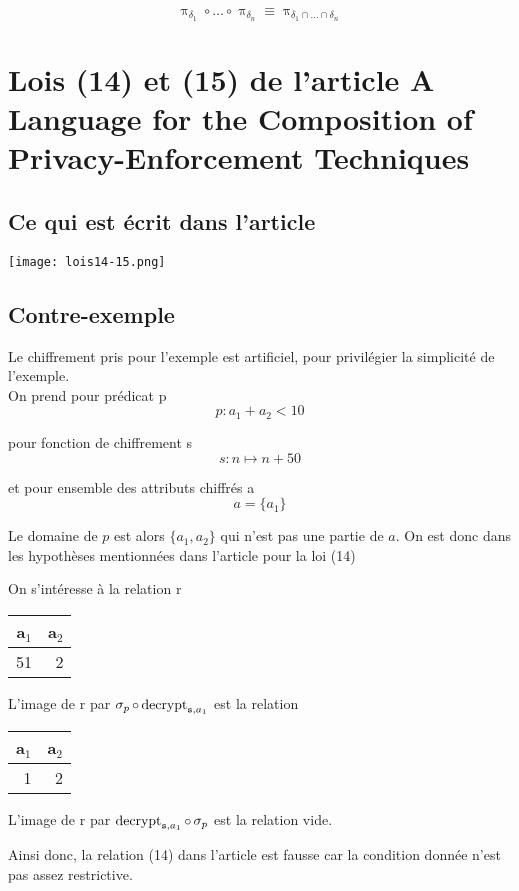 \documentclass[french]{article}
\DeclareMathOperator{\proj}{\pi}
\DeclareMathOperator{\sel}{\sigma}
\DeclareMathOperator{\decrypt}{decrypt}
\newcommand\typeT[1]{\text{\ttfamily #1}}
\newcommand{\decryptArgs}[2]{\decrypt_{\typeT{#1}, #2}}
\begin{document}
$$
\proj_{\delta_1} \circ \dots \circ \proj_{\delta_n} 
\equiv \proj_{\delta_1 \cap \dots \cap \delta_n}
$$

\section*{Lois (14) et (15) de l'article A Language for the Composition of Privacy-Enforcement Techniques}
\subsection*{Ce qui est écrit dans l'article}
\texttt{[image: lois14-15.png]}

\subsection*{Contre-exemple}
Le chiffrement pris pour l'exemple est artificiel, pour privilégier la simplicité de l'exemple. \\

On prend pour prédicat p 
$$p: a_1 + a_2 < 10$$ 

pour fonction de chiffrement s
$$ s: n \mapsto n + 50 $$

et pour ensemble des attributs chiffrés a
$$ a = \{a_1\} $$

Le domaine de $p$ est alors $\{a_1, a_2\}$
qui n'est pas une partie de $a$.
On est donc dans les hypothèses mentionnées
dans l'article pour la loi (14)

On s'intéresse à la relation r
\begin{center}
	\begin{tabular}{rr}
		a\(_{\text{1}}\) & a\(_{\text{2}}\)\\
		\hline
		51 & 2\\
	\end{tabular}
\end{center}

L'image de r par
$\sel_p \circ \decryptArgs{s}{a_1}$
est la relation
\begin{center}
	\begin{tabular}{rr}
		a\(_{\text{1}}\) & a\(_{\text{2}}\)\\
		\hline
		1 & 2\\
	\end{tabular}
\end{center}

L'image de r par
$\decryptArgs{s}{a_1} \circ \sel_p$
est la relation vide.

Ainsi donc, la relation (14)
dans l'article est fausse
car la condition donnée n'est pas assez restrictive.
\end{document}
